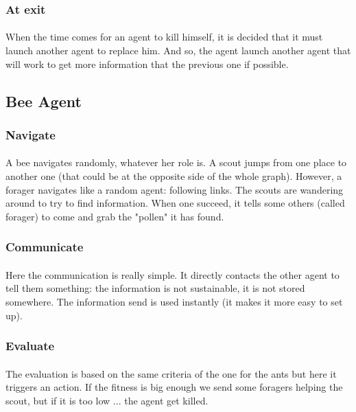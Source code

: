 \documentclass{article}
\begin{document}
	\subsubsection{At exit}
	\paragraph{}
	When the time comes for an agent to kill himself, it is decided that it must launch another agent to replace him.
	And so, the agent launch another agent that will work to get more information that the previous one if possible.
	\subsection{Bee Agent}
	\subsubsection{Navigate}
	\paragraph{}
	A bee navigates randomly, whatever her role is.
	A scout jumps from one place to another one (that could be at the opposite side of the whole graph).
	However, a forager navigates like a random agent: following links.
	The scouts are wandering around to try to find information.
	When one succeed, it tells some others (called forager) to come and grab the "pollen" it has found.
	\subsubsection{Communicate}
	\paragraph{}
	Here the communication is really simple.
	It directly contacts the other agent to tell them something: the information is not sustainable, it is not stored somewhere.
	The information send is used instantly (it makes it more easy to set up).
	\subsubsection{Evaluate}
	\paragraph{}
	The evaluation is based on the same criteria of the one for the ants but here it triggers an action.
	If the fitness is big enough we send some foragers helping the scout, but if it is too low ... the agent get killed.
\end{document}
